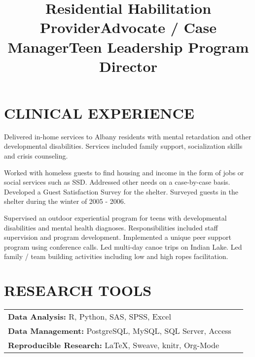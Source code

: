 \documentclass[line, margin, 10pt]{res}
\begin{document}
\begin{resume}
  \section{CLINICAL EXPERIENCE}

  \title{Residential Habilitation Provider}
  \begin{position}
    Delivered in-home services to Albany residents with mental
    retardation and other developmental disabilities. Services included
    family support, socialization skills and crisis counseling.
  \end{position}

  \title{Advocate / Case Manager}
  \begin{position}
    Worked with homeless guests to find housing and income in the form
    of jobs or social services such as SSD. Addressed other needs on a case-by-case
    basis. Developed a Guest Satisfaction Survey for the shelter. Surveyed
    guests in the shelter during the winter of 2005 - 2006.
  \end{position}

  \title{Teen Leadership Program Director}
  \begin{position}
    Supervised an outdoor experiential program for teens with
    developmental disabilities and mental health
    diagnoses. Responsibilities included staff supervision and program
    development. Implemented a unique peer support program using
    conference calls. Led multi-day canoe trips on Indian Lake. Led family
    / team building activities including low and high ropes
    facilitation.
  \end{position}

  \section{RESEARCH TOOLS}

  \begin{tabular} {l l}
    {\bf Data Analysis:} R, Python, SAS, SPSS, Excel\\
    {\bf Data Management:} PostgreSQL, MySQL, SQL Server, Access\\
    {\bf Reproducible Research:} \LaTeX, Sweave, knitr, Org-Mode\\
  \end{tabular}


\end{resume}
\end{document}

